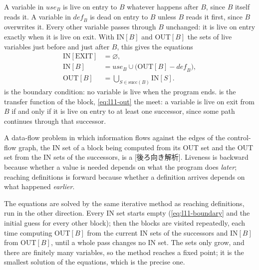 \documentclass[../main.tex]{subfiles}
\begin{document}
%
A variable in $\mathit{use}_B$ is live on entry to $B$ whatever happens
after $B$, since $B$ itself reads it.  A variable in $\mathit{def}_B$ is
dead on entry to $B$ unless $B$ reads it first, since $B$ overwrites it.
Every other variable passes through $B$ unchanged: it is live on entry
exactly when it is live on exit.  With IN$[B]$ and OUT$[B]$ the sets of
live variables just before and just after $B$, this gives the equations
\begin{align}
  \mathrm{IN}[\mathrm{EXIT}] &= \varnothing, \label{eq:l11-boundary}\\
  \mathrm{IN}[B] &= \mathit{use}_B \cup
     \bigl(\mathrm{OUT}[B] - \mathit{def}_B\bigr), \label{eq:l11-in}\\
  \mathrm{OUT}[B] &= \bigcup_{S \in \mathrm{succ}(B)} \mathrm{IN}[S].
     \label{eq:l11-out}
\end{align}
%
 is the boundary condition: no variable is live
when the program ends.   is the transfer function of
the block, \cref{eq:l11-out} the meet: a variable is live on exit from
$B$ if and only if it is live on entry to at least one successor, since
some path continues through that successor.

\begin{definition}
  \label{def:l11-backward}
  A data-flow problem in which information flows against the edges of
  the control-flow graph, the IN set of a block being computed from its
  OUT set and the OUT set from the IN sets of the successors, is a
  [後ろ向き解析].  Liveness is backward because
  whether a value is needed depends on what the program does
  \emph{later}; reaching definitions is forward because whether a
  definition arrives depends on what happened \emph{earlier}.
\end{definition}

The equations are solved by the same iterative method as reaching
definitions, run in the other direction.  Every IN set starts empty
(\cref{eq:l11-boundary} and the initial guess for every other block);
then the blocks are visited repeatedly, each time computing OUT$[B]$
from the current IN sets of the successors and IN$[B]$ from OUT$[B]$,
until a whole pass changes no IN set.  The
sets only grow, and there are finitely many variables, so the method
reaches a fixed point; it is the smallest solution of the equations,
which is the precise one.
\end{document}
